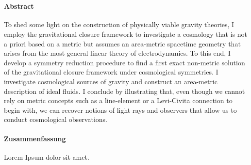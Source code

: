 \cleardoublepage
\thispagestyle{plain}

\makeatletter
\begin{center}
	\large\textbf{\@title}\\
	\normalsize\@author
\end{center}
\makeatother

\paragraph{Abstract}

To shed some light on the construction of physically viable gravity theories, I employ the gravitational closure framework to investigate a cosmology that is not a priori based on a metric but assumes an area-metric spacetime geometry that arises from the most general linear theory of electrodynamics. To this end, I develop a symmetry reduction procedure to find a first exact non-metric solution of the gravitational closure framework under cosmological symmetries. I investigate cosmological sources of gravity and construct an area-metric description of ideal fluids. I conclude by illustrating that, even though we cannot rely on metric concepts such as a line-element or a Levi-Civita connection to begin with, we can recover notions of light rays and observers that allow us to conduct cosmological observations.

\begin{otherlanguage}{ngerman}

\paragraph{Zusammenfassung}

Lorem Ipsum dolor sit amet.

\end{otherlanguage}
